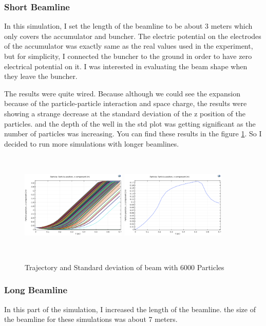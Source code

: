 \documentclass{article}
\begin{document}
\subsubsection{Short Beamline}
In this simulation, I set the length of the beamline to be about 3 meters which only covers the accumulator and buncher. The electric potential on the electrodes of the accumulator was exactly same as the real values used in the experiment, but for simplicity, I connected the buncher to the ground in order to have zero electrical potential on it. I was interested in evaluating the beam shape when they leave the buncher.

The results were quite wired. Because although we could see the expansion because of the particle-particle interaction and space charge, the results were showing a strange decrease at the standard deviation of the z position of the particles. and the depth of the well in the std plot was getting significant as the number of particles was increasing. You can find these results in the figure \ref{short}. So I decided to run more simulations with longer beamlines.

\begin{figure}[h]
\centering
\includegraphics[width=50mm, height=50mm]{sim-in-6000}
\includegraphics[width=50mm, height=50mm]{sim-std-6000}
\caption{Trajectory and Standard deviation of beam with 6000 Particles}
\label{short}
\end{figure}

\subsubsection{Long Beamline}
In this part of the simulation, I increased the length of the beamline. the size of the beamline for these simulations was about 7 meters. 
\end{document}

